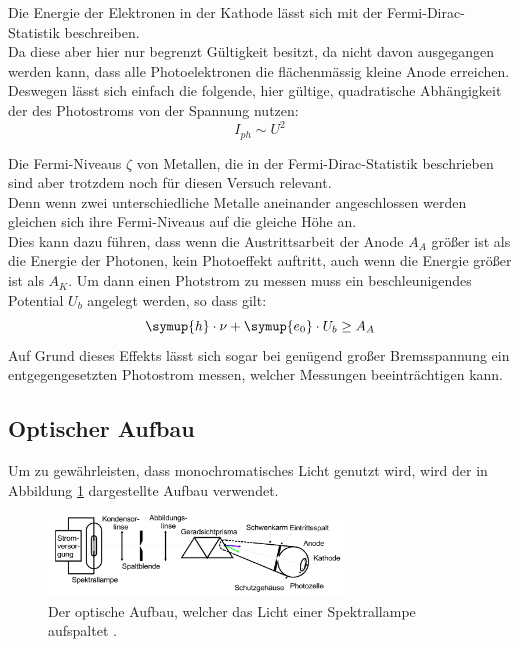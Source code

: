     \noindent Die Energie der Elektronen in der Kathode lässt sich mit der Fermi-Dirac-Statistik beschreiben.\\
    Da diese aber hier nur begrenzt Gültigkeit besitzt, da nicht davon ausgegangen werden kann, dass alle Photoelektronen die flächenmässig kleine Anode erreichen.
    Deswegen lässt sich einfach die folgende, hier gültige, quadratische Abhängigkeit der des Photostroms von der Spannung nutzen:
    \begin{equation}
        I_{ph} \sim U^2
        \label{eqn:quad}
    \end{equation}

    Die Fermi-Niveaus $\zeta$ von Metallen, die in der Fermi-Dirac-Statistik beschrieben sind aber trotzdem noch für diesen Versuch relevant.\\
    Denn wenn zwei unterschiedliche Metalle aneinander angeschlossen werden gleichen sich ihre Fermi-Niveaus auf die gleiche Höhe an.\\
    Dies kann dazu führen, dass wenn die Austrittsarbeit der Anode $A_A$ größer ist als die Energie der Photonen, kein Photoeffekt auftritt, auch wenn die Energie größer ist als $A_K$.
    Um dann einen Photstrom zu messen muss ein beschleunigendes Potential $U_b$ angelegt werden, so dass gilt:
    \begin{equation*}
        \symup{h} \cdot \nu + \symup{e_0} \cdot U_b \geq A_A
    \end{equation*}
    Auf Grund dieses Effekts lässt sich sogar bei genügend großer Bremsspannung ein entgegengesetzten Photostrom messen, welcher Messungen beeinträchtigen kann.




    \subsection{Optischer Aufbau}

    Um zu gewährleisten, dass monochromatisches Licht genutzt wird, wird der in Abbildung \ref{img:linse} dargestellte Aufbau verwendet.


    \begin{figure}[H]
        \centering
        \includegraphics[width=0.7\textwidth]{latex/images/Optiken.PNG}
        \caption{Der optische Aufbau, welcher das Licht einer Spektrallampe aufspaltet  \protect \cite{500}.}
        \label{img:linse}
    \end{figure}

